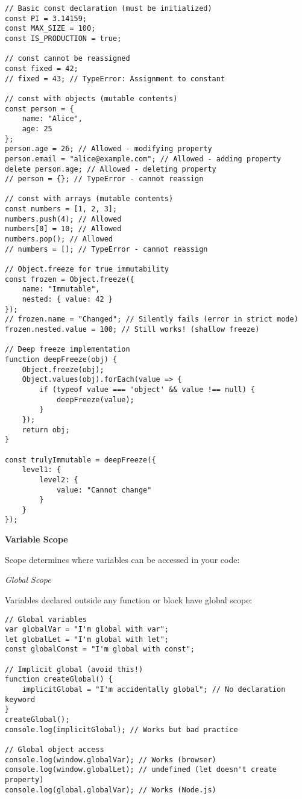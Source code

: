 \documentclass[12pt,a4paper,oneside]{book}
\newcommand{\mysubsection}[1]{%
    \vspace{0.2em}
    {\normalsize\bfseries #1}
    \vspace{0.1em}
    \addcontentsline{toc}{subsection}{#1}
}
\newcommand{\mysubsubsection}[1]{%
    \vspace{0.1em}
    {\normalsize\itshape #1}
    \vspace{0.1em}
}
\begin{document}
\begin{lstlisting}[style=javascript, caption={\textbf{const Declaration Characteristics}}, label=lst:const-details]
// Basic const declaration (must be initialized)
const PI = 3.14159;
const MAX_SIZE = 100;
const IS_PRODUCTION = true;

// const cannot be reassigned
const fixed = 42;
// fixed = 43; // TypeError: Assignment to constant

// const with objects (mutable contents)
const person = {
    name: "Alice",
    age: 25
};
person.age = 26; // Allowed - modifying property
person.email = "alice@example.com"; // Allowed - adding property
delete person.age; // Allowed - deleting property
// person = {}; // TypeError - cannot reassign

// const with arrays (mutable contents)
const numbers = [1, 2, 3];
numbers.push(4); // Allowed
numbers[0] = 10; // Allowed
numbers.pop(); // Allowed
// numbers = []; // TypeError - cannot reassign

// Object.freeze for true immutability
const frozen = Object.freeze({
    name: "Immutable",
    nested: { value: 42 }
});
// frozen.name = "Changed"; // Silently fails (error in strict mode)
frozen.nested.value = 100; // Still works! (shallow freeze)

// Deep freeze implementation
function deepFreeze(obj) {
    Object.freeze(obj);
    Object.values(obj).forEach(value => {
        if (typeof value === 'object' && value !== null) {
            deepFreeze(value);
        }
    });
    return obj;
}

const trulyImmutable = deepFreeze({
    level1: {
        level2: {
            value: "Cannot change"
        }
    }
});
\end{lstlisting}

\mysubsection{Variable Scope}

Scope determines where variables can be accessed in your code:

\mysubsubsection{Global Scope}

Variables declared outside any function or block have global scope:

\begin{lstlisting}[style=javascript, caption={\textbf{Global Scope}}, label=lst:global-scope]
// Global variables
var globalVar = "I'm global with var";
let globalLet = "I'm global with let";
const globalConst = "I'm global with const";

// Implicit global (avoid this!)
function createGlobal() {
    implicitGlobal = "I'm accidentally global"; // No declaration keyword
}
createGlobal();
console.log(implicitGlobal); // Works but bad practice

// Global object access
console.log(window.globalVar); // Works (browser)
console.log(window.globalLet); // undefined (let doesn't create property)
console.log(global.globalVar); // Works (Node.js)
\end{lstlisting}
\end{document}
